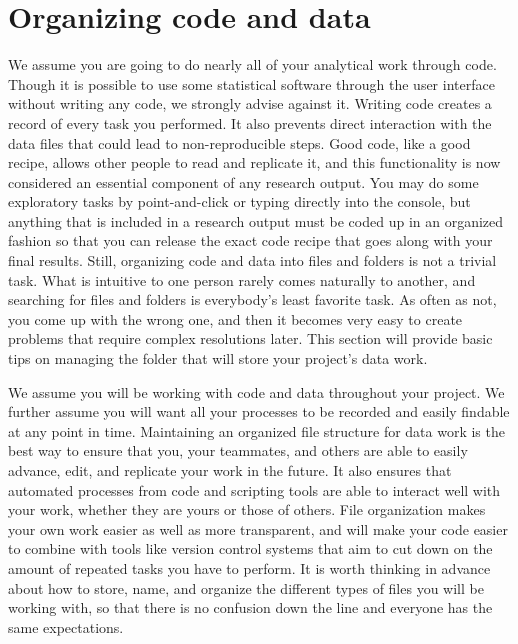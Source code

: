 \section{Organizing code and data}

We assume you are going to do nearly all of your analytical work through code.
Though it is possible to use some statistical software through the user interface
without writing any code, we strongly advise against it.
Writing code creates a record of every task you performed.
It also prevents direct interaction with the data files that could lead to non-reproducible steps.
Good code, like a good recipe, allows other people to read and replicate it,
and this functionality is now considered an essential component of any research output.
You may do some exploratory tasks by point-and-click or typing directly into the console,
but anything that is included in a research output
must be coded up in an organized fashion so that you can release
the exact code recipe that goes along with your final results.
Still, organizing code and data into files and folders is not a trivial task.
What is intuitive to one person rarely comes naturally to another,
and searching for files and folders is everybody's least favorite task.
As often as not, you come up with the wrong one,
and then it becomes very easy to create problems that require complex resolutions later.
This section will provide basic tips on managing the folder
that will store your project's data work.

We assume you will be working with code and data throughout your project.
We further assume you will want all your processes to be recorded
and easily findable at any point in time.
Maintaining an organized file structure for data work is the best way
to ensure that you, your teammates, and others
are able to easily advance, edit, and replicate your work in the future.
It also ensures that automated processes from code and scripting tools
are able to interact well with your work,
whether they are yours or those of others.
File organization makes your own work easier as well as more transparent,
and will make your code easier to combine with tools like version control systems
that aim to cut down on the amount of repeated tasks you have to perform.
It is worth thinking in advance about how to store, name, and organize
the different types of files you will be working with,
so that there is no confusion down the line
and everyone has the same expectations.

